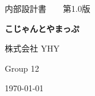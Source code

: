 \begin{titlepage}
    \centering
    {\large 内部設計書　　第1.0版\par}
    \vspace{2cm}

    {\LARGE \textbf{こじゃんとやまっぷ}\par}
    \vspace{2cm}

    {\large 株式会社 YHY\par Group 12\par}
    \vspace{2cm}
    {\large \today \par}
\end{titlepage}